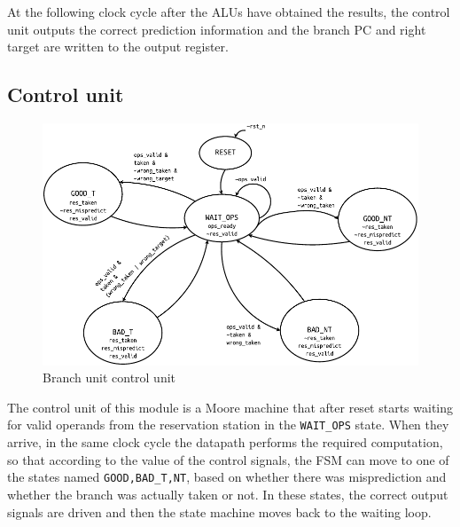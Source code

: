 At the following clock cycle after the \acsp{ALU} have obtained the results, the control unit outputs the correct prediction information and the branch \ac{PC} and right target are written to the output register.

\subsection{Control unit}
\begin{figure}[hbt]
  \centering
  \includegraphics[width=\textwidth]{img/branch_unit_fsm.pdf}
  \caption{Branch unit control unit}
  \label{fig:branch_unit_fsm}
\end{figure}
The control unit of this module is a Moore machine that after reset starts waiting for valid operands from the reservation station in the \texttt{WAIT\_OPS} state. When they arrive, in the same clock cycle the datapath performs the required computation, so that according to the value of the control signals, the \acs{FSM} can move to one of the states named \texttt{{GOOD,BAD}\_{T,NT}}, based on whether there was misprediction and whether the branch was actually taken or not. In these states, the correct output signals are driven and then the state machine moves back to the waiting loop.
